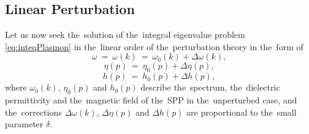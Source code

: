 \subsection{Linear Perturbation}

Let us now seek the~solution of the~integral eigenvalue problem \cref{eq:inteqPlasmon} in the~linear order of the~perturbation theory in the~form of
\begin{equation}
\label{eq:deltaomegaPlasmon}
\omega~=~\omega(k)~=~\omega_0(k)+\Delta \omega(k),
\end{equation}
\begin{equation}
\label{eq:deltaetaPlasmon}
\eta(p)~=~\eta_0(p)+\Delta\eta(p),
\end{equation}
\begin{equation}
\label{eq:deltahPlasmon}
h(p)~=~h_0(p)+\Delta h(p),
\end{equation}
where $\omega_0(k)$, $\eta_0(p)$ and $h_0(p)$ describe the~spectrum, the~dielectric permittivity and the~magnetic field of the~SPP in the~unperturbed case, and the~corrections $\Delta \omega(k)$, $\Delta \eta(p)$ and $\Delta h(p)$ are proportional to the~small parameter $\delta$.

